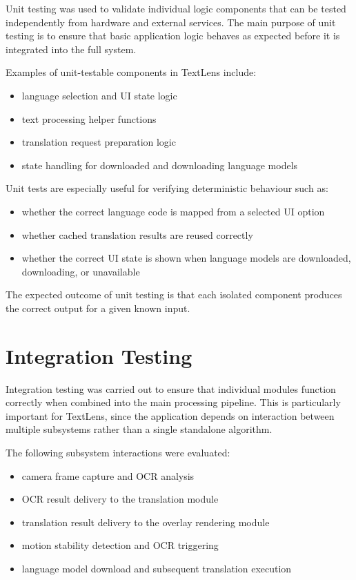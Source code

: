 Unit testing was used to validate individual logic components that can be tested independently from hardware and external services. The main purpose of unit testing is to ensure that basic application logic behaves as expected before it is integrated into the full system.

Examples of unit-testable components in TextLens include:

\begin{itemize}
    \item language selection and UI state logic
    \item text processing helper functions
    \item translation request preparation logic
    \item state handling for downloaded and downloading language models
\end{itemize}

Unit tests are especially useful for verifying deterministic behaviour such as:

\begin{itemize}
    \item whether the correct language code is mapped from a selected UI option
    \item whether cached translation results are reused correctly
    \item whether the correct UI state is shown when language models are downloaded, downloading, or unavailable
\end{itemize}

The expected outcome of unit testing is that each isolated component produces the correct output for a given known input.

\section{Integration Testing}

Integration testing was carried out to ensure that individual modules function correctly when combined into the main processing pipeline. This is particularly important for TextLens, since the application depends on interaction between multiple subsystems rather than a single standalone algorithm.

The following subsystem interactions were evaluated:

\begin{itemize}
    \item camera frame capture and OCR analysis
    \item OCR result delivery to the translation module
    \item translation result delivery to the overlay rendering module
    \item motion stability detection and OCR triggering
    \item language model download and subsequent translation execution
\end{itemize}


